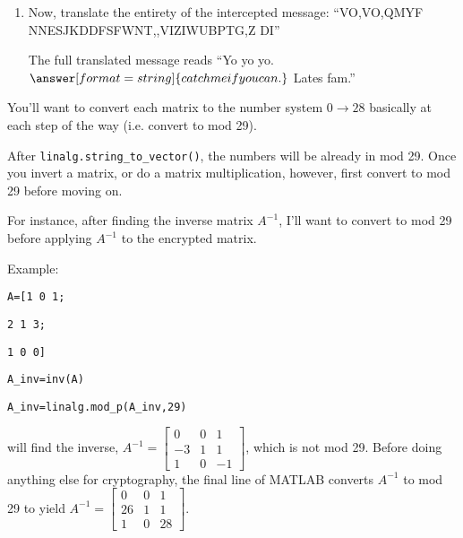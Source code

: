 \documentclass{ximera}
\begin{document}
\begin{problem}
\begin{enumerate}
\begin{problem}
\begin{enumerate}
                \item Now, translate the entirety of the intercepted message: ``VO,VO,QMYF NNESJKDDFSFWNT,,VIZIWUBPTG,Z DI''
                
                The full translated message reads ``Yo yo yo. $\answer[format=string]{catch me if you can.}$ Lates fam.''
            \end{enumerate}

            \begin{hint}
            
                You'll want to convert each matrix to the number system $0\rightarrow 28$ basically at each step of the way (i.e. convert to mod 29).

                After \texttt{linalg.string\_to\_vector()}, the numbers will be already in mod 29. Once you invert a matrix, or do a matrix multiplication, however, first convert to mod 29 before moving on. 

                For instance, after finding the inverse matrix $A^{-1}$, I'll want to convert to mod 29 before applying $A^{-1}$ to the encrypted matrix. 

                Example:

                \texttt{A=[1 0 1;}

                \texttt{2 1 3;}

                \texttt{1 0 0]}

                \texttt{A\_inv=inv(A)}

                \texttt{A\_inv=linalg.mod\_p(A\_inv,29)}


                will find the inverse, $A^{-1}=\begin{bmatrix}
                    0 & 0 & 1\\-3 & 1 & 1\\1 & 0 & -1
                \end{bmatrix}$, which is not mod 29. Before doing anything else for cryptography, the final line of MATLAB converts $A^{-1}$ to mod 29 to yield $A^{-1}=\begin{bmatrix}
                    0 & 0 & 1\\ 26 & 1 & 1 \\ 1 & 0 & 28
                \end{bmatrix}.$

            \end{hint}

            
            
        \end{problem}


    \end{enumerate}

\end{problem}
\end{document}
